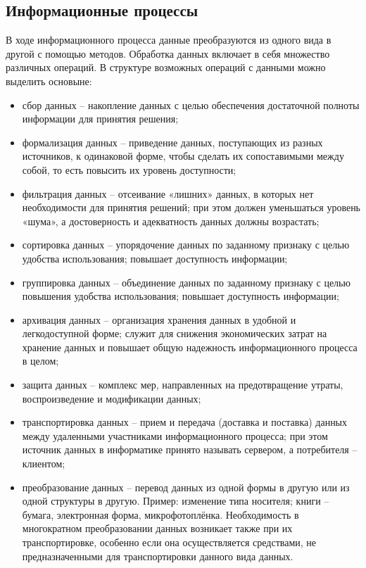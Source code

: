 \documentclass[a4paper]{article}
\begin{document}
\subsection{Информационные процессы}

В ходе информационного процесса данные преобразуются из одного вида в другой с помощью методов. Обработка данных включает в себя множество различных операций. В структуре возможных операций с данными можно выделить основыне:

\begin{itemize}
\item сбор данных – накопление данных с целью обеспечения достаточной полноты информации для принятия решения;

\item формализация данных – приведение данных, поступающих из разных источников, к одинаковой форме, чтобы сделать их сопоставимыми между собой, то есть повысить их уровень доступности;

\item фильтрация данных – отсеивание «лишних» данных, в которых нет необходимости для принятия решений; при этом должен уменьшаться уровень «шума», а достоверность и адекватность данных должны возрастать;

\item сортировка данных – упорядочение данных по заданному признаку с целью удобства использования; повышает доступность информации;

\item группировка данных – объединение данных по заданному признаку с целью повышения удобства использования; повышает доступность информации;

\item архивация данных – организация хранения данных в удобной и легкодоступной форме; служит для снижения экономических затрат на хранение данных и повышает общую надежность информационного процесса в целом;

\item защита данных – комплекс мер, направленных на предотвращение утраты, воспроизведение и модификации данных;

\item транспортировка данных – прием и передача (доставка и поставка) данных между удаленными участниками информационного процесса; при этом источник данных в информатике принято называть сервером, а потребителя – клиентом;

\item преобразование данных – перевод данных из одной формы в другую или из одной структуры в другую. Пример: изменение типа носителя; книги – бумага, электронная форма, микрофотоплёнка. Необходимость в многократном преобразовании данных возникает также при их транспортировке, особенно если она осуществляется средствами, не предназначенными для транспортировки данного вида данных.

\end{itemize}
\end{document}
